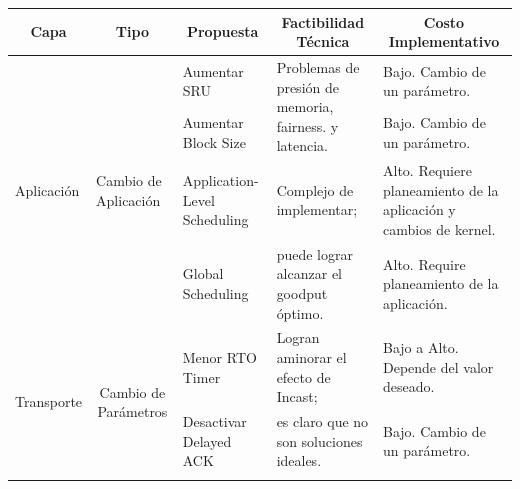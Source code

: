 \documentclass[runningheads,a4paper]{llncs}
\begin{document}
\begin{landscape}
\begin{table}[]
\centering
\begin{tabular}{|c|c|l|l|l|}
\hline
\textbf{Capa}                                     & \textbf{Tipo}                                              & \multicolumn{1}{c|}{\textbf{Propuesta}} & \multicolumn{1}{c|}{\textbf{Factibilidad Técnica}}                      & \multicolumn{1}{c|}{\textbf{Costo Implementativo}}                \\ \hline
\multicolumn{1}{|l|}{\multirow{4}{*}{Aplicación}} & \multicolumn{1}{l|}{\multirow{4}{*}{Cambio de Aplicación}} & Aumentar SRU                            & \multirow{2}{*}{Problemas de presión de memoria, fairness. y latencia.} & Bajo. Cambio de un parámetro.                                     \\ \cline{3-3} \cline{5-5} 
\multicolumn{1}{|l|}{}                            & \multicolumn{1}{l|}{}                                      & Aumentar Block Size                     &                                                                         & Bajo. Cambio de un parámetro.                                     \\ \cline{3-5} 
\multicolumn{1}{|l|}{}                            & \multicolumn{1}{l|}{}                                      & Application-Level Scheduling            & Complejo de implementar;                                                & Alto. Requiere planeamiento de la aplicación y cambios de kernel. \\ \cline{3-3} \cline{5-5} 
\multicolumn{1}{|l|}{}                            & \multicolumn{1}{l|}{}                                      & Global Scheduling                       & puede lograr alcanzar el goodput óptimo.                                & Alto. Require planeamiento de la aplicación.                      \\ \hline
\multirow{9}{*}{Transporte}                       & \multirow{4}{*}{Cambio de Parámetros}                      & Menor RTO Timer                         & Logran aminorar el efecto de Incast;                                    & Bajo a Alto. Depende del valor deseado.                           \\ \cline{3-3} \cline{5-5} 
                                                  &                                                            & Desactivar Delayed ACK                  & es claro que no son soluciones ideales.                                 & Bajo. Cambio de un parámetro.                                     \\ \cline{3-3} \cline{5-5} 

\end{tabular}
\end{table}
\end{landscape}
\end{document}
